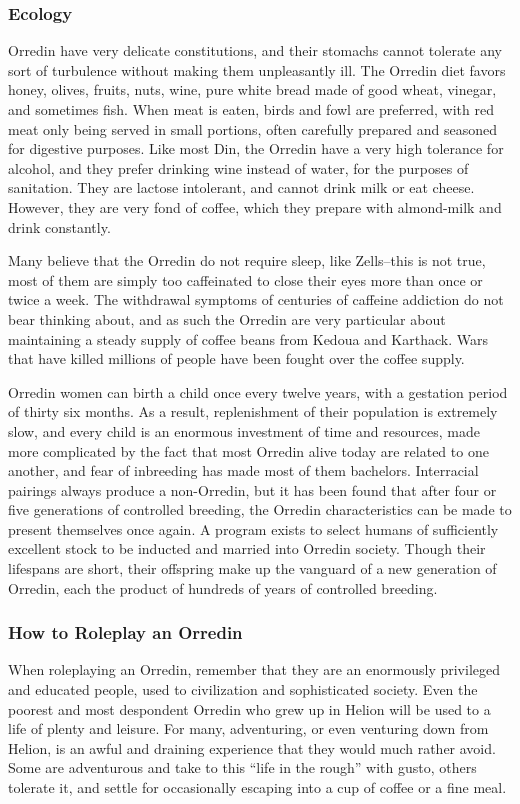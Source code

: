 \documentclass[oneside,11pt,english]{book}
\begin{document}
\subsubsection*{Ecology} 
Orredin have very delicate constitutions, and their stomachs cannot tolerate any sort of turbulence without 
making them unpleasantly ill. The Orredin diet favors honey, olives, fruits, nuts, wine, pure white bread 
made of good wheat, vinegar, and sometimes fish. When meat is eaten, birds and fowl are preferred, with 
red meat only being served in small portions, often carefully prepared and seasoned for digestive 
purposes. Like most Din, the Orredin have a very high tolerance for alcohol, and they prefer drinking 
wine instead of water, for the purposes of sanitation. They are lactose intolerant, and cannot drink milk or 
eat cheese. However, they are very fond of coffee, which they prepare with almond-milk and drink 
constantly. 

Many believe that the Orredin do not require sleep, like Zells--this is not true, most of them 
are simply too caffeinated to close their eyes more than once or twice a week. The withdrawal symptoms 
of centuries of caffeine addiction do not bear thinking about, and as such the Orredin are very particular 
about maintaining a steady supply of coffee beans from Kedoua and Karthack. Wars that have killed 
millions of people have been fought over the coffee supply. 

Orredin women can birth a child once every twelve years, with a gestation period of thirty six months. As 
a result, replenishment of their population is extremely slow, and every child is an enormous investment 
of time and resources, made more complicated by the fact that most Orredin alive today are related to one 
another, and fear of inbreeding has made most of them bachelors. 
Interracial pairings always produce a non-Orredin, but it has been found that after four or five generations 
of controlled breeding, the Orredin characteristics can be made to present themselves once again. A 
program exists to select humans of sufficiently excellent stock to be inducted and married into Orredin 
society. Though their lifespans are short, their offspring make up the vanguard of a new generation of 
Orredin, each the product of hundreds of years of controlled breeding. 

\subsubsection{How to Roleplay an Orredin}
When roleplaying an Orredin, remember that they are an enormously privileged and educated people, 
used to civilization and sophisticated society. Even the poorest and most despondent Orredin who grew 
up in Helion will be used to a life of plenty and leisure. For many, adventuring, or even venturing down 
from Helion, is an awful and draining experience that they would much rather avoid. Some are 
adventurous and take to this “life in the rough” with gusto, others tolerate it, and settle for occasionally 
escaping into a cup of coffee or a fine meal.
\end{document}
